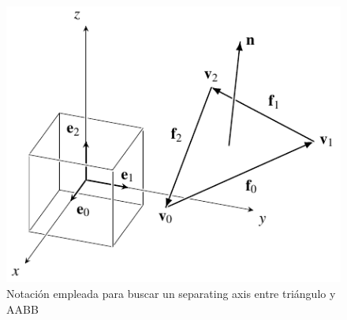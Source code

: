 \begin{figure}
\centering
\includegraphics[width=.6\textwidth]{img/search/triangle_aabb.pdf}
\caption{Notación empleada para buscar un separating axis entre triángulo y AABB}
\label{triangle_aabb}
\end{figure}


